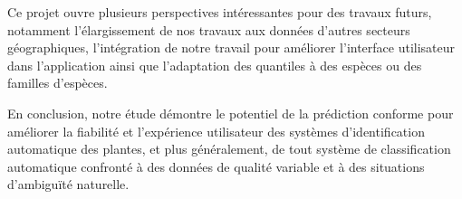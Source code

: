\documentclass[a4paper,12pt]{article}
\begin{document}
Ce projet ouvre plusieurs perspectives intéressantes pour des travaux futurs, notamment l'élargissement de nos travaux aux données d'autres secteurs géographiques, l'intégration de notre travail pour améliorer l'interface utilisateur dans l'application ainsi que l'adaptation des quantiles à des espèces ou des familles d'espèces.

\vspace{0.2cm}

En conclusion, notre étude démontre le potentiel de la prédiction conforme pour améliorer la fiabilité et l'expérience utilisateur des systèmes d'identification automatique des plantes, et plus généralement, de tout système de classification automatique confronté à des données de qualité variable et à des situations d'ambiguïté naturelle.

\printbibliography
\end{document}
